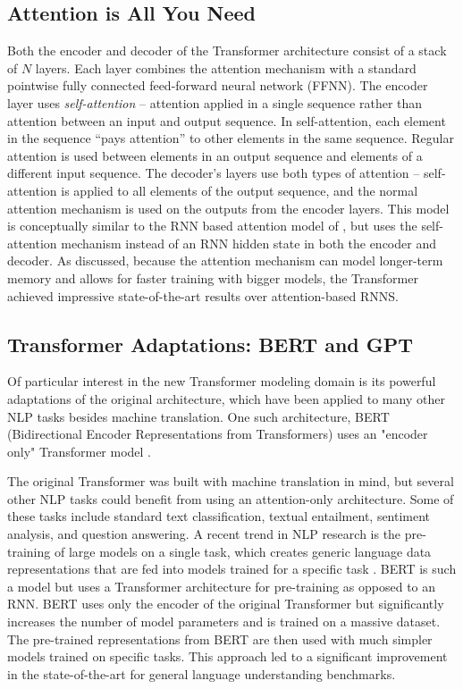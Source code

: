 \subsection{Attention is All You Need}
Both the encoder and decoder of the Transformer architecture consist of a stack of $N$ layers. Each layer combines the attention mechanism with a standard pointwise fully connected feed-forward neural network (FFNN). The encoder layer uses \emph{self-attention} -- attention applied in a single sequence rather than attention between an input and output sequence. In self-attention, each element in the sequence ``pays attention'' to other elements in the same sequence. Regular attention is used between elements in an output sequence and elements of a different input sequence. The decoder's layers use both types of attention -- self-attention is applied to all elements of the output sequence, and the normal attention mechanism is used on the outputs from the encoder layers. This model is conceptually similar to the RNN based attention model of \citet{bahdanau2014neural}, but uses the self-attention mechanism instead of an RNN hidden state in both the encoder and decoder. As discussed, because the attention mechanism can model longer-term memory and allows for faster training with bigger models, the Transformer achieved impressive state-of-the-art results over attention-based RNNS. 

\subsection{Transformer Adaptations: BERT and GPT}
Of particular interest in the new Transformer modeling domain is its powerful adaptations of the original architecture, which have been applied to many other NLP tasks besides machine translation. One such architecture, BERT (Bidirectional Encoder Representations from Transformers) uses an "encoder only" Transformer model \cite{devlin2018bert}. 

The original Transformer was built with machine translation in mind, but several other NLP tasks could benefit from using an attention-only architecture. Some of these tasks include standard text classification, textual entailment, sentiment analysis, and question answering. A recent trend in NLP research is the pre-training of large models on a single task, which creates generic language data representations that are fed into models trained for a specific task \cite{peters2018deep}. BERT is such a model but uses a Transformer architecture for pre-training as opposed to an RNN. BERT uses only the encoder of the original Transformer but significantly increases the number of model parameters and is trained on a massive dataset. The pre-trained representations from BERT are then used with much simpler models trained on specific tasks. This approach led to a significant improvement in the state-of-the-art for general language understanding benchmarks.  

